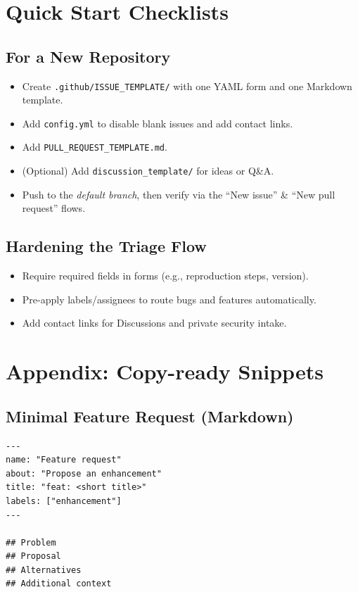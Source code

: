 \documentclass[11pt]{article}
\begin{document}
\section{Quick Start Checklists}
\subsection*{For a New Repository}
\begin{itemize}
  \item Create \texttt{.github/ISSUE\_TEMPLATE/} with one YAML form and one Markdown template.
  \item Add \texttt{config.yml} to disable blank issues and add contact links.
  \item Add \texttt{PULL\_REQUEST\_TEMPLATE.md}.
  \item (Optional) Add \texttt{discussion\_template/} for ideas or Q\&A.
  \item Push to the \emph{default branch}, then verify via the ``New issue'' \& ``New pull request'' flows.
\end{itemize}

\subsection*{Hardening the Triage Flow}
\begin{itemize}
  \item Require required fields in forms (e.g., reproduction steps, version).
  \item Pre-apply labels/assignees to route bugs and features automatically.
  \item Add contact links for Discussions and private security intake.
\end{itemize}
\clearpage

\section{Appendix: Copy-ready Snippets}

\subsection*{Minimal Feature Request (Markdown)}
\begin{verbatim}
---
name: "Feature request"
about: "Propose an enhancement"
title: "feat: <short title>"
labels: ["enhancement"]
---

## Problem
## Proposal
## Alternatives
## Additional context
\end{verbatim}
\end{document}
